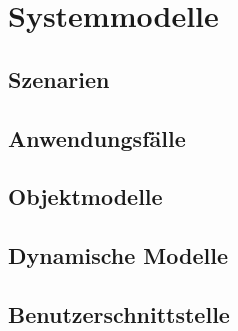 \documentclass[parskip=full]{scrartcl}
\begin{document}
\section{Systemmodelle}

\subsection{Szenarien}

\subsection{Anwendungsfälle}

\subsection{Objektmodelle}

\subsection{Dynamische Modelle}

\subsection{Benutzerschnittstelle}
\end{document}
